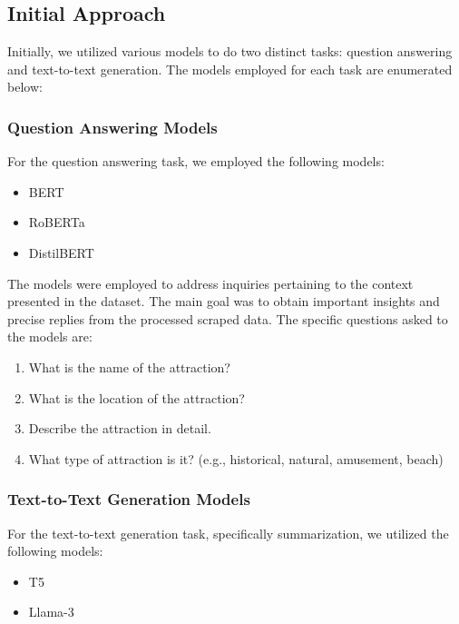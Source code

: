 \documentclass[conference]{IEEEtran}
\begin{document}
    \subsection{Initial Approach}

        Initially, we utilized various models to do two distinct tasks: question answering and text-to-text generation. The models employed for each task are enumerated below:

        \subsubsection{Question Answering Models}
            For the question answering task, we employed the following models:
            \begin{itemize}
                \item BERT
                \item RoBERTa
                \item DistilBERT
            \end{itemize}

            The models were employed to address inquiries pertaining to the context presented in the dataset. The main goal was to obtain important insights and precise replies from the processed scraped data. The specific questions asked to the models are:

            \begin{tcolorbox}[linewidth=1pt, innerleftmargin=15pt, innerrightmargin=15pt, innertopmargin=15pt, innerbottommargin=15pt]
                \begin{enumerate}
                    \item What is the name of the attraction?
                    \item What is the location of the attraction?
                    \item Describe the attraction in detail.
                    \item What type of attraction is it? (e.g., historical, natural, amusement, beach)
                \end{enumerate}
            \end{tcolorbox}

        \subsubsection{Text-to-Text Generation Models}
            For the text-to-text generation task, specifically summarization, we utilized the following models:
            \begin{itemize}
                \item T5
                \item Llama-3
            \end{itemize}
\end{document}
